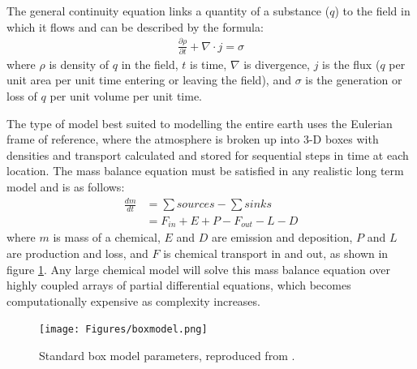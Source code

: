     The general continuity equation links a quantity of a substance ($q$) to the field in which it flows and can be described by the formula:
    \begin{align*}
      \frac{\partial \rho}{\partial t} + \nabla \cdot j = \sigma 
    \end{align*}
    where $\rho$ is density of $q$ in the field, $t$ is time, $\nabla$ is divergence, $j$ is the flux ($q$ per unit area per unit time entering or leaving the field), and $\sigma$ is the generation or loss of $q$ per unit volume per unit time.
    
    
    The type of model best suited to modelling the entire earth uses the Eulerian frame of reference, where the atmosphere is broken up into 3-D boxes with densities and transport calculated and stored for sequential steps in time at each location.
    The mass balance equation must be satisfied in any realistic long term model and is as follows: 
    \begin{align*}
      \frac{dm}{dt} & = \sum{sources}-\sum{sinks} \\
                    & = F_{in} + E + P - F_{out} - L - D 
    \end{align*}
    where $m$ is mass of a chemical, $E$ and $D$ are emission and deposition, $P$ and $L$ are production and loss, and $F$ is chemical transport in and out, as shown in figure \ref{LR:Models:fig_boxmodel}.
    Any large chemical model will solve this mass balance equation over highly coupled arrays of partial differential equations, which becomes computationally expensive as complexity increases.
    
    \begin{figure}
      \texttt{[image: Figures/boxmodel.png]}
      \caption{ %
        Standard box model parameters, reproduced from \textcite{Jacob_1999_book}. }
      \label{LR:Models:fig_boxmodel}
    \end{figure}
    
